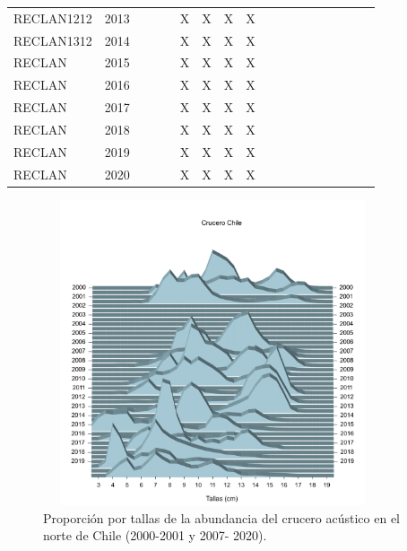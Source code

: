 \documentclass[letter,11pt]{article}
\begin{document}
\begin{table}[htb!]
\begin{tabular}{lccccccccccccccccc}
 RECLAN1212 & 2013 & & & & \cellcolor{Gray}X & \cellcolor{Gray}X & \cellcolor{Gray}X & \cellcolor{Gray}X & & & & & & & & & \\
 RECLAN1312 & 2014 & & & & \cellcolor{Gray}X & \cellcolor{Gray}X & \cellcolor{Gray}X & \cellcolor{Gray}X & & & & & & & & & \\
 RECLAN & 2015 & & & & \cellcolor{Gray}X & \cellcolor{Gray}X & \cellcolor{Gray}X & \cellcolor{Gray}X & & & & & & & & & \\
 RECLAN & 2016 & & & & \cellcolor{Gray}X & \cellcolor{Gray}X & \cellcolor{Gray}X & \cellcolor{Gray}X & & & & & & & & & \\
 RECLAN & 2017 & & & & \cellcolor{Gray}X & \cellcolor{Gray}X & \cellcolor{Gray}X & \cellcolor{Gray}X & & & & & & & & & \\
 RECLAN & 2018 & & & & \cellcolor{Gray}X & \cellcolor{Gray}X & \cellcolor{Gray}X & \cellcolor{Gray}X & & & & & & & & & \\
 RECLAN & 2019 & & & & \cellcolor{Gray}X & \cellcolor{Gray}X & \cellcolor{Gray}X & \cellcolor{Gray}X & & & & & & & & & \\
 RECLAN & 2020 & & & & \cellcolor{Gray}X & \cellcolor{Gray}X & \cellcolor{Gray}X & \cellcolor{Gray}X & & & & & & & & & \\
 \hline
 \end{tabular}
\end{table}

\vspace{0.5cm}
\begin{figure}[htb!]
 \centering
 \includegraphics[width=10cm,height=9cm]{Figuras/figura18.pdf}
 \caption{Proporci\'on por tallas de la abundancia del crucero ac\'ustico en el norte de Chile (2000-2001 y 2007- 2020).}
 \label{Fig18}
\end{figure}
\end{document}
